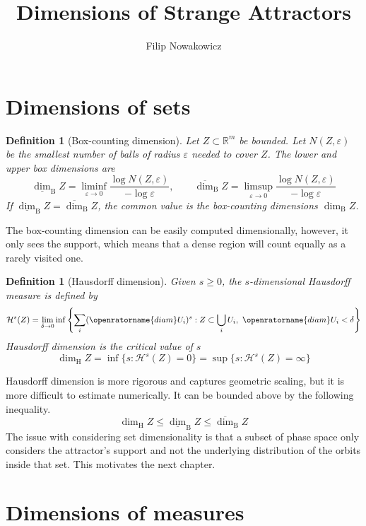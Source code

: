 \documentclass[11pt,a4paper]{article}
\title{\textbf{Dimensions of Strange Attractors}}
\author{Filip Nowakowicz}
\newtheorem{definition}[theorem]{Definition}
\newcommand{\eps}{\varepsilon}
\newcommand{\dimH}{\dim_{\mathrm H}}
\begin{document}
\maketitle

\tableofcontents
\newpage

\section{Dimensions of sets}

\begin{definition}[Box-counting dimension]
	Let \(Z\subset \mathbb R^m\) be bounded. Let \(N(Z,\eps)\) be the smallest number of balls of radius \(\eps\) needed to cover \(Z\). The lower and upper box dimensions are
	\[
		\underline{\dim}_{\mathrm B} Z
		= \liminf_{\eps\to 0}\frac{\log N(Z,\eps)}{-\log \eps},
		\qquad
		\overline{\dim}_{\mathrm B} Z
		= \limsup_{\eps\to 0}\frac{\log N(Z,\eps)}{-\log \eps}
	\]
	If \(\underline{\dim}_{\mathrm B} Z = \overline{\dim}_{\mathrm B} Z\), the common value is the box-counting dimensions \(\dim_{\mathrm B} Z\).
\end{definition}

The box-counting dimension can be easily computed dimensionally, however, it only sees the support, which means that a dense region will count equally as a rarely visited one.

\begin{definition}[Hausdorff dimension]
	Given \(s\geq 0\), the \(s\)-dimensional Hausdorff measure is defined by
	\[
		\mathcal{H}^s(Z)
		= \lim_{\delta\to 0}
		\inf\left\{\sum_i (\openratorname{diam} U_i)^s:
		Z\subset \bigcup_i U_i,\ \openratorname{diam} U_i<\delta\right\}
	\]
	Hausdorff dimension is the critical value of \(s\)
	\[
		\dimH Z = \inf\{s: \mathcal{H}^s(Z)=0\}
		= \sup\{s: \mathcal{H}^s(Z)=\infty\}
	\]
\end{definition}
Hausdorff dimension is more rigorous and captures geometric scaling, but it is more difficult to estimate numerically. It can be bounded above by the following inequality.
\[
	\dimH Z \leq \underline{\dim}_{\mathrm B} Z
	\leq \overline{\dim}_{\mathrm B} Z
\]
The issue with considering set dimensionality is that a subset of phase space only considers the attractor's support and not the underlying distribution of the orbits inside that set. This motivates the next chapter.

\section{Dimensions of measures}
\end{document}
